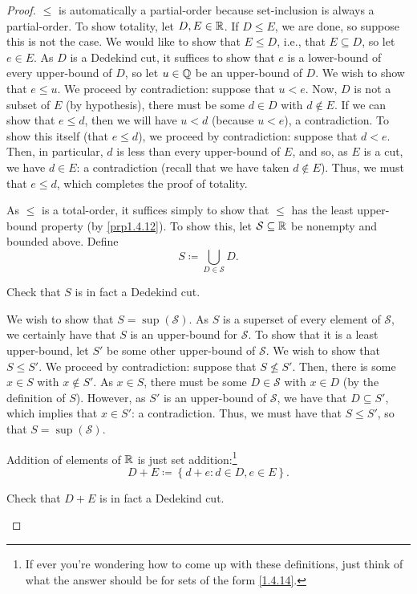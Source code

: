 \begin{thm}
\begin{proof}
$\leq$ is automatically a partial-order because set-inclusion is always a partial-order.  To show totality, let $D,E\in \mathbb{R}$.  If $D\leq E$, we are done, so suppose this is not the case.  We would like to show that $E\leq D$, i.e., that $E\subseteq D$, so let $e\in E$.  As $D$ is a Dedekind cut, it suffices to show that $e$ is a lower-bound of every upper-bound of $D$, so let $u\in \mathbb{Q}$ be an upper-bound of $D$.  We wish to show that $e\leq u$.  We proceed by contradiction:  suppose that $u<e$.  Now, $D$ is not a subset of $E$ (by hypothesis), there must be some $d\in D$ with $d\notin E$.  If we can show that $e\leq d$, then we will have $u<d$ (because $u<e$), a contradiction.  To show this itself (that $e\leq d$), we proceed by contradiction:  suppose that $d<e$.  Then, in particular, $d$ is less than every upper-bound of $E$, and so, as $E$ is a cut, we have $d\in E$:  a contradiction (recall that we have taken $d\notin E$).  Thus, we must that $e\leq d$, which completes the proof of totality.

As $\leq$ is a total-order, it suffices simply to show that $\leq$ has the least upper-bound property (by \cref{prp1.4.12}).  To show this, let $\mathcal{S}\subseteq \mathbb{R}$ be nonempty and bounded above.  Define
\begin{equation}
S\coloneqq \bigcup _{D\in \mathcal{S}}D.
\end{equation}
\begin{exr}
Check that $S$ is in fact a Dedekind cut.
\end{exr}
We wish to show that $S=\sup \left( \mathcal{S}\right)$.  As $S$ is a superset of every element of $\mathcal{S}$, we certainly have that $S$ is an upper-bound for $\mathcal{S}$.  To show that it is a least upper-bound, let $S'$ be some other upper-bound of $\mathcal{S}$.  We wish to show that $S\leq S'$.  We proceed by contradiction:  suppose that $S\not \leq S'$.  Then, there is some $x\in S$ with $x\notin S'$.  As $x\in S$, there must be some $D\in \mathcal{S}$ with $x\in D$ (by the definition of $S$).  However, as $S'$ is an upper-bound of $\mathcal{S}$, we have that $D\subseteq S'$, which implies that $x\in S'$:  a contradiction.  Thus, we must have that $S\leq S'$, so that $S=\sup \left( \mathcal{S}\right)$.

Addition of elements of $\mathbb{R}$ is just set addition:\footnote{If ever you're wondering how to come up with these definitions, just think of what the answer should be for sets of the form \eqref{1.4.14}.}
\begin{equation}
D+E\coloneqq \left\{ d+e:d\in D,e\in E\right\} .
\end{equation}
\begin{exr}
Check that $D+E$ is in fact a Dedekind cut.
\end{exr}


\end{proof}
\end{thm}
